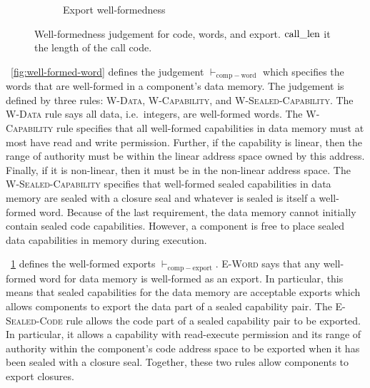 \documentclass[acmsmall,screen]{acmart}\settopmatter{}
\newenvironment{jversion}%
    {\color{OliveGreen}}{}
\begin{document}
\begin{jversion}
\begin{figure}
  \begin{subfigure}[h]{1.0\linewidth}
    \caption{Export well-formedness}
    \label{fig:well-formed-export}
  \end{subfigure}
  \caption{Well-formedness judgement for code, words, and export. $\mathrm{call\_len}$ it the length of the call code.}
  \label{fig:well-formed-aux}
\end{figure}
\figurename~\ref{fig:well-formed-word} defines the judgement $\vdash_{\mathrm{comp-word}}$ which specifies the words that are well-formed in a component's data memory.
The judgement is defined by three rules: \textsc{W-Data}, \textsc{W-Capability}, and \textsc{W-Sealed-Capability}.
The \textsc{W-Data} rule says all data, i.e.\ integers, are well-formed words.
The \textsc{W-Capability} rule specifies that all well-formed capabilities in data memory must at most have read and write permission.
Further, if the capability is linear, then the range of authority must be within the linear address space owned by this address.
Finally, if it is non-linear, then it must be in the non-linear address space.
The \textsc{W-Sealed-Capability} specifies that well-formed sealed capabilities in data memory are sealed with a closure seal and whatever is sealed is itself a well-formed word.
Because of the last requirement, the data memory cannot initially contain sealed code capabilities.
However, a component is free to place sealed data capabilities in memory during execution.

\figurename~\ref{fig:well-formed-export} defines the well-formed exports $\vdash_{\mathrm{comp-export}}$.
\textsc{E-Word} says that any well-formed word for data memory is well-formed as an export.
In particular, this means that sealed capabilities for the data memory are acceptable exports which allows components to export the data part of a sealed capability pair.
The \textsc{E-Sealed-Code} rule allows the code part of a sealed capability pair to be exported.
In particular, it allows a capability with read-execute permission and its range of authority within the component's code address space to be exported when it has been sealed with a closure seal.
Together, these two rules allow components to export closures.


\end{jversion}
\end{document}
